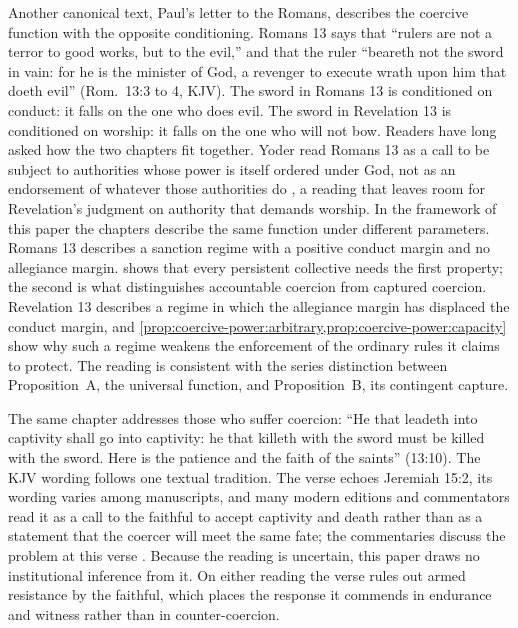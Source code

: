 \documentclass[11pt,letterpaper]{article}
\theoremstyle{definition}
\theoremstyle{remark}
\begin{document}
Another canonical text, Paul's letter to the Romans, describes the coercive function with the opposite conditioning. Romans 13 says that ``rulers are not a terror to good works, but to the evil,'' and that the ruler ``beareth not the sword in vain: for he is the minister of God, a revenger to execute wrath upon him that doeth evil'' (Rom.~13:3 to 4, KJV). The sword in Romans 13 is conditioned on conduct: it falls on the one who does evil. The sword in Revelation 13 is conditioned on worship: it falls on the one who will not bow. Readers have long asked how the two chapters fit together. Yoder read Romans 13 as a call to be subject to authorities whose power is itself ordered under God, not as an endorsement of whatever those authorities do \citep{yoder1972}, a reading that leaves room for Revelation's judgment on authority that demands worship. In the framework of this paper the chapters describe the same function under different parameters. Romans 13 describes a sanction regime with a positive conduct margin and no allegiance margin.  shows that every persistent collective needs the first property; the second is what distinguishes accountable coercion from captured coercion. Revelation 13 describes a regime in which the allegiance margin has displaced the conduct margin, and \cref{prop:coercive-power:arbitrary,prop:coercive-power:capacity} show why such a regime weakens the enforcement of the ordinary rules it claims to protect. The reading is consistent with the series distinction between Proposition~A, the universal function, and Proposition~B, its contingent capture.

The same chapter addresses those who suffer coercion: ``He that leadeth into captivity shall go into captivity: he that killeth with the sword must be killed with the sword. Here is the patience and the faith of the saints'' (13:10). The KJV wording follows one textual tradition. The verse echoes Jeremiah 15:2, its wording varies among manuscripts, and many modern editions and commentators read it as a call to the faithful to accept captivity and death rather than as a statement that the coercer will meet the same fate; the commentaries discuss the problem at this verse \citep{aune1998b,koester2014}. Because the reading is uncertain, this paper draws no institutional inference from it. On either reading the verse rules out armed resistance by the faithful, which places the response it commends in endurance and witness rather than in counter-coercion.
\end{document}
